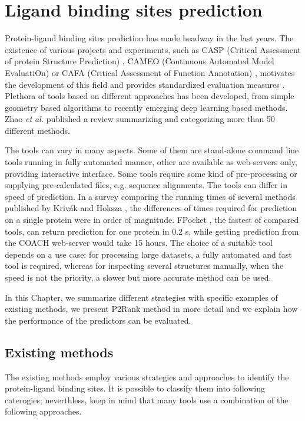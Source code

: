 \chapter{Ligand binding sites prediction} \label{ch:2}

Protein-ligand binding sites prediction has made headway in the last years. The existence of various projects and experiments, such as CASP (Critical Assessment of protein Structure Prediction) \cite{casp_def}, CAMEO (Continuous Automated Model EvaluatiOn) \cite{cameo} or CAFA (Critical Assessment of Function Annotation) \cite{cafa}, motivates the development of this field and provides standardized evaluation measures \cite{methods}. Plethora of tools based on different approaches has been developed, from simple geometry based algorithms to recently emerging deep learning based methods. Zhao \textit{et al.} \cite{methods} published a review summarizing and categorizing more than 50 different methods.

The tools can vary in many aspects. Some of them are stand-alone command line tools running in fully automated manner, other are available as web-servers only, providing interactive interface. Some tools require some kind of pre-processing or supplying pre-calculated files, e.g. sequence alignments. The tools can differ in speed of prediction. In a survey comparing the running times of several methods published by Krivák and Hoksza \cite{p2rank1}, the differences of times required for prediction on a single protein were in order of magnitude. FPocket \cite{fpocket}, the fastest of compared tools, can return prediction for one protein in 0.2 s, while getting prediction from the COACH web-server \cite{coach} would take 15 hours. The choice of a suitable tool depends on a use case: for processing large datasets, a fully automated and fast tool is required, whereas for inspecting several structures manually, when the speed is not the priority, a slower but more accurate method can be used.

In this Chapter, we summarize different strategies with specific examples of existing methods, we present P2Rank method in more detail and we explain how the performance of the predictors can be evaluated.

\section{Existing methods} \label{s:existingmethods}

The existing methods employ various strategies and approaches to identify the protein-ligand binding sites. It is possible to classify them into following caterogies; neverthless, keep in mind that many tools use a combination of the following approaches.

